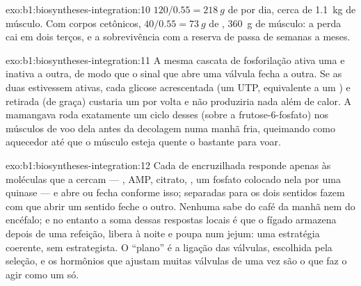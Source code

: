 \begin{solution}{exo:b1:biosyntheses-integration:10}
$120/0.55 = \qty{218}{g}$ de  por dia, cerca de \qty{1.1}{kg} de
músculo. Com corpos cetônicos, $40/0.55 = \qty{73}{g}$ de ,
\qty{360}{g} de músculo: a perda cai em dois terços, e a sobrevivência
com a reserva de  passa de semanas a meses.
\end{solution}

\begin{solution}{exo:b1:biosyntheses-integration:11}
A mesma cascata de fosforilação ativa uma e inativa a outra, de modo que
o sinal que abre uma válvula fecha a outra. Se as duas estivessem
ativas, cada glicose acrescentada (um UTP, equivalente a um ) e
retirada (de graça) custaria um  por volta e não produziria nada além
de calor. A mamangava roda exatamente um ciclo desses (sobre a
frutose-6-fosfato) nos músculos de voo dela antes da decolagem numa
manhã fria, queimando  como aquecedor até que o músculo esteja quente
o bastante para voar.
\end{solution}

\begin{solution}{exo:b1:biosyntheses-integration:12}
Cada  de encruzilhada responde apenas às moléculas que a cercam
--- , AMP, citrato, , um fosfato colocado nela por uma
quinase --- e abre ou fecha conforme isso;  separadas para os
dois sentidos fazem com que abrir um sentido feche o outro. Nenhuma
 sabe do café da manhã nem do encéfalo; e no entanto a soma dessas
respostas locais é que o fígado armazena depois de uma refeição, libera
à noite e poupa  num jejum: uma estratégia coerente, sem
estrategista. O ``plano'' é a ligação das válvulas, escolhida pela
seleção, e os hormônios que ajustam muitas válvulas de uma vez são o que
faz o  agir como um só.
\end{solution}

